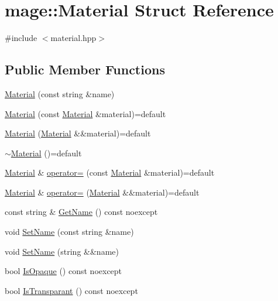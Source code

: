 \hypertarget{structmage_1_1_material}{}\section{mage\+:\+:Material Struct Reference}
\label{structmage_1_1_material}


{\ttfamily \#include $<$material.\+hpp$>$}

\subsection*{Public Member Functions}
\begin{DoxyCompactItemize}
\item 
\hyperlink{structmage_1_1_material_a0307d3bcf53c6ba270c8be4d127298db}{Material} (const string \&name)
\item 
\hyperlink{structmage_1_1_material_abed630412cdc4a6281389d128ec4b5f3}{Material} (const \hyperlink{structmage_1_1_material}{Material} \&material)=default
\item 
\hyperlink{structmage_1_1_material_a41bfbc2bfa16e3694ac443d390b804c2}{Material} (\hyperlink{structmage_1_1_material}{Material} \&\&material)=default
\item 
\hyperlink{structmage_1_1_material_a4ca65b7e24144ee08dd1ce8d0eda9284}{$\sim$\+Material} ()=default
\item 
\hyperlink{structmage_1_1_material}{Material} \& \hyperlink{structmage_1_1_material_a7ebc9986924ca13ae8468005518dcfc7}{operator=} (const \hyperlink{structmage_1_1_material}{Material} \&material)=default
\item 
\hyperlink{structmage_1_1_material}{Material} \& \hyperlink{structmage_1_1_material_a500a2ebe99d4d7b3be5bf57b6bff62a1}{operator=} (\hyperlink{structmage_1_1_material}{Material} \&\&material)=default
\item 
const string \& \hyperlink{structmage_1_1_material_a9edb2f437eca07c6c12c24d10ec30eb3}{Get\+Name} () const noexcept
\item 
void \hyperlink{structmage_1_1_material_a4795f7aa36a445c09af6268a4af8cb61}{Set\+Name} (const string \&name)
\item 
void \hyperlink{structmage_1_1_material_ad612e4174b030bb002cedaf054e18f82}{Set\+Name} (string \&\&name)
\item 
bool \hyperlink{structmage_1_1_material_a0df1804c29bfd9d2bbc606d6285dccec}{Is\+Opaque} () const noexcept
\item 
bool \hyperlink{structmage_1_1_material_a6a62e3889887e77259070e1f9cd9150f}{Is\+Transparant} () const noexcept

\end{DoxyCompactItemize}
